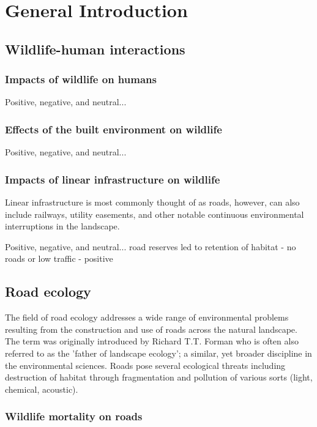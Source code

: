 \chapter{General Introduction}\label{sec:intro}
\newpage

\section{Wildlife-human interactions}

\subsection{Impacts of wildlife on humans}

Positive, negative, and neutral...

\subsection{Effects of the built environment on wildlife}

Positive, negative, and neutral...

\subsection{Impacts of linear infrastructure on wildlife}

Linear infrastructure is most commonly thought of as roads, however, can also include railways, utility easements, and other notable continuous environmental interruptions in the landscape.

Positive, negative, and neutral...
road reserves led to retention of habitat - no roads or low traffic - positive

\section{Road ecology}

The field of road ecology addresses a wide range of environmental problems resulting from the construction and use of roads across the natural landscape.  The term was originally introduced by Richard T.T. Forman who is often also referred to as the 'father of landscape ecology'; a similar, yet broader discipline in the environmental sciences. Roads pose several ecological threats including destruction of habitat through fragmentation and pollution of various sorts (light, chemical, acoustic).

\subsection{Wildlife mortality on roads}

